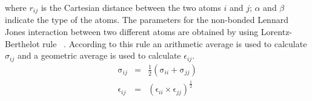 \begin{sloppypar}
\begin{equation}
\end{equation}
 where $r_{ij}$ is the Cartesian distance between the two atoms $i$ and $j$; $\alpha$ and $\beta$  indicate the type of the atoms. The parameters for the non-bonded Lennard Jones interaction between two different atoms are obtained by using Lorentz-Berthelot 
rule~ \citep{Gromacs-manual}. According to this rule an arithmetic average is used to calculate $\sigma_{ij}$ and  a geometric average is used to calculate $\epsilon_{ij}$.
\begin{eqnarray} 
\mathrm{\sigma}_{ij} &= & \frac{1}{2} \left(\mathrm{\sigma}_{ii} + \mathrm{\sigma}_{jj} \right)\\
\mathrm{\epsilon}_{ij} &=& \left(\mathrm{\epsilon}_{ii} \times \mathrm{\epsilon}_{jj} \right)^{\frac{1}{2}} 
\end{eqnarray} 
\end{sloppypar}

